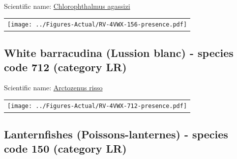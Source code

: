 \documentclass[12pt]{article}\usepackage[]{graphicx}\usepackage[]{color}
\begin{document}

Scientific name: \href{http://www.marinespecies.org/aphia.php?p=taxdetails\&id=126336}{Chlorophthalmus agassizi} \newline
\begin{minipage}{1.0\textwidth}
 \begin{tabular}{c}
\texttt{[image: ../Figures-Actual/RV-4VWX-156-presence.pdf]} \\ 
\end{tabular} 
\end{minipage}
\clearpage

\renewcommand\thefigure{\thesubsection\Alph{figure}}

\setcounter{figure}{0}

\hypertarget{sec:712}{%
\subsection{White barracudina (Lussion blanc) - species code 712 (category LR)}\label{sec:712}}

  


Scientific name: \href{http://www.marinespecies.org/aphia.php?p=taxdetails\&id=126352}{Arctozenus risso} \newline
\begin{minipage}{1.0\textwidth}
 \begin{tabular}{c}
\texttt{[image: ../Figures-Actual/RV-4VWX-712-presence.pdf]} \\ 
\end{tabular} 
\end{minipage}
\clearpage

\renewcommand\thefigure{\thesubsection\Alph{figure}}

\setcounter{figure}{0}

\hypertarget{sec:150}{%
\subsection{Lanternfishes (Poissons-lanternes) - species code 150 (category LR)}\label{sec:150}}

  

\end{document}
